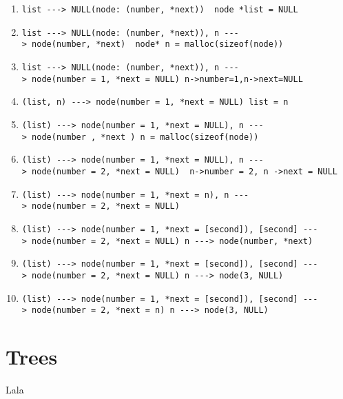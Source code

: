\documentclass[
]{article}
\providecommand{\tightlist}{%
  \setlength{\itemsep}{0pt}\setlength{\parskip}{0pt}}
\begin{document}
\begin{enumerate}
\def\labelenumi{\arabic{enumi}.}
\tightlist
\item
  \texttt{list\ -\/-\/-\textgreater{}\ NULL(node:\ (number,\ *next))\ \textbar{}\textbar{}\textbar{}\textbar{}\ node\ *list\ =\ NULL}
\item
  \texttt{list\ -\/-\/-\textgreater{}\ NULL(node:\ (number,\ *next)),\ n\ -\/-\/-\textgreater{}\ node(number,\ *next)\ \ node*\ n\ =\ malloc(sizeof(node))}
\item
  \texttt{list\ -\/-\/-\textgreater{}\ NULL(node:\ (number,\ *next)),\ n\ -\/-\/-\textgreater{}\ node(number\ =\ 1,\ *next\ =\ NULL)\ n-\textgreater{}number=1,n-\textgreater{}next=NULL}
\item
  \texttt{(list,\ n)\ -\/-\/-\textgreater{}\ node(number\ =\ 1,\ *next\ =\ NULL)\ list\ =\ n}
\item
  \texttt{(list)\ -\/-\/-\textgreater{}\ node(number\ =\ 1,\ *next\ =\ NULL),\ n\ -\/-\/-\textgreater{}\ node(number\ ,\ *next\ )\ n\ =\ malloc(sizeof(node))}
\item
  \texttt{(list)\ -\/-\/-\textgreater{}\ node(number\ =\ 1,\ *next\ =\ NULL),\ n\ -\/-\/-\textgreater{}\ node(number\ =\ 2,\ *next\ =\ NULL)\ \textbar{}\textbar{}\textbar{}\textbar{}\ n-\textgreater{}number\ =\ 2,\ n\ -\textgreater{}next\ =\ NULL}
\item
  \texttt{(list)\ -\/-\/-\textgreater{}\ node(number\ =\ 1,\ *next\ =\ n),\ n\ -\/-\/-\textgreater{}\ node(number\ =\ 2,\ *next\ =\ NULL)}
\item
  \texttt{(list)\ -\/-\/-\textgreater{}\ node(number\ =\ 1,\ *next\ =\ {[}second{]}),\ {[}second{]}\ -\/-\/-\textgreater{}\ node(number\ =\ 2,\ *next\ =\ NULL)\ n\ -\/-\/-\textgreater{}\ node(number,\ *next)}
\item
  \texttt{(list)\ -\/-\/-\textgreater{}\ node(number\ =\ 1,\ *next\ =\ {[}second{]}),\ {[}second{]}\ -\/-\/-\textgreater{}\ node(number\ =\ 2,\ *next\ =\ NULL)\ n\ -\/-\/-\textgreater{}\ node(3,\ NULL)}
\item
  \texttt{(list)\ -\/-\/-\textgreater{}\ node(number\ =\ 1,\ *next\ =\ {[}second{]}),\ {[}second{]}\ -\/-\/-\textgreater{}\ node(number\ =\ 2,\ *next\ =\ n)\ n\ -\/-\/-\textgreater{}\ node(3,\ NULL)}
\end{enumerate}

\hypertarget{trees}{%
\section{Trees}\label{trees}}

Lala
\end{document}
